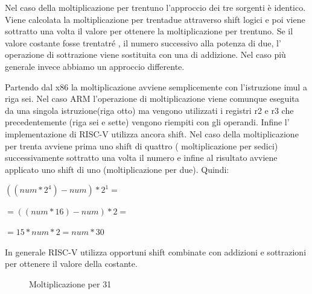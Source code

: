\documentclass[12pt,a4paper]{report}
\begin{document}
\vspace{0.3 cm}

Nel caso della moltiplicazione per trentuno l'approccio dei tre sorgenti è identico. Viene calcolata la moltiplicazione per trentadue attraverso shift logici e poi viene sottratto una volta il valore per ottenere la moltiplicazione per trentuno. Se il valore costante fosse trentatré , il numero successivo alla potenza di due, l' operazione di sottrazione viene sostituita con una di addizione. Nel caso più generale invece abbiamo un approccio differente.

Partendo dal x86 la moltiplicazione avviene semplicemente con l'istruzione imul a riga sei.  Nel caso ARM l'operazione di moltiplicazione viene comunque eseguita da una singola istruzione(riga otto) ma vengono utilizzati i registri r2 e r3 che precedentemente (riga sei e sette) vengono riempiti con gli operandi. Infine l' implementazione di RISC-V utilizza ancora shift. Nel caso della moltiplicazione per trenta avviene prima uno shift di quattro ( moltiplicazione per sedici) successivamente sottratto una volta il numero e infine al risultato avviene applicato uno shift di uno (moltiplicazione per due).  Quindi: 
\begin{center}
	\vspace{0.2cm}
$((num * 2^4) - num ) * 2^1 = $ 

$ =((num * 16 ) - num ) * 2 =$ 

$ = 15 * num * 2 =  num *30 $ 
\end{center}


\vspace{0.2 cm}
In generale RISC-V utilizza opportuni shift combinate con addizioni e sottrazioni per ottenere il valore della costante.

\begin{figure}[h]

     \begin{subfigure}[b]{0.3\textwidth}
  
        
        \label{Code:Mul31RISC}


     \end{subfigure}
     \hfill
     \begin{subfigure}[b]{0.3\textwidth}
         
          	
		
		 \label{Code:Mul31ARM}
     \end{subfigure}
     \hfill
     \begin{subfigure}[b]{0.3\textwidth}
         
          
	
	 \label{Code:Mul31X86}
     \end{subfigure}
     \caption{Moltiplicazione per 31}
     \end{figure}
\end{document}
